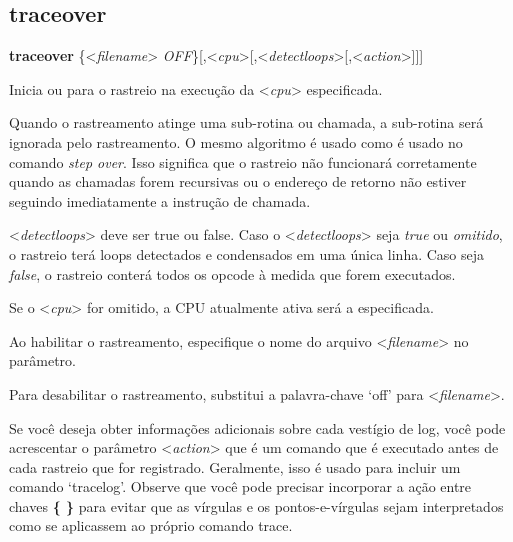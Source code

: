 \documentclass[letterpaper,10pt,brazil]{sphinxmanual}
\begin{document}
\subsection{traceover}
\label{debugger/execution:traceover}\label{debugger/execution:debugger-command-traceover}
\begin{DUlineblock}{0em}
\item[]
\begin{DUlineblock}{\DUlineblockindent}
\item[] \textbf{traceover} \{\textless{}\emph{filename}\textgreater{} \textbar{} \emph{OFF}\}{[},\textless{}\emph{cpu}\textgreater{}{[},\textless{}\emph{detectloops}\textgreater{}{[},\textless{}\emph{action}\textgreater{}{]}{]}{]}
\item[] 
\end{DUlineblock}
\item[] Inicia ou para o rastreio na execução da \textless{}\emph{cpu}\textgreater{} especificada.
\item[] 
\item[] Quando o rastreamento atinge uma sub-rotina ou chamada, a sub-rotina será ignorada pelo rastreamento. O mesmo algoritmo é usado como é usado no comando \emph{step over}. Isso significa que o rastreio não funcionará corretamente quando as chamadas forem recursivas ou o endereço de retorno não estiver seguindo imediatamente a instrução de chamada.
\item[] 
\item[] \textless{}\emph{detectloops}\textgreater{} deve ser true ou false. Caso o \textless{}\emph{detectloops}\textgreater{} seja \emph{true} ou \emph{omitido}, o rastreio terá loops detectados e condensados em uma única linha. Caso seja \emph{false}, o rastreio conterá todos os opcode à medida que forem executados.
\item[] Se o \textless{}\emph{cpu}\textgreater{} for omitido, a CPU atualmente ativa será a especificada.
\item[] Ao habilitar o rastreamento, especifique o nome do arquivo \textless{}\emph{filename}\textgreater{} no parâmetro.
\item[] Para desabilitar o rastreamento, substitui a palavra-chave `off' para \textless{}\emph{filename}\textgreater{}.
\item[] Se você deseja obter informações adicionais sobre cada vestígio de log, você pode acrescentar o parâmetro \textless{}\emph{action}\textgreater{} que é um comando que é executado antes de cada rastreio que for registrado. Geralmente, isso é usado para incluir um comando `tracelog'. Observe que você pode precisar incorporar a ação entre chaves \textbf{\{ \}} para evitar que as vírgulas e os pontos-e-vírgulas sejam interpretados como se aplicassem ao próprio comando trace.

\end{DUlineblock}
\end{document}
